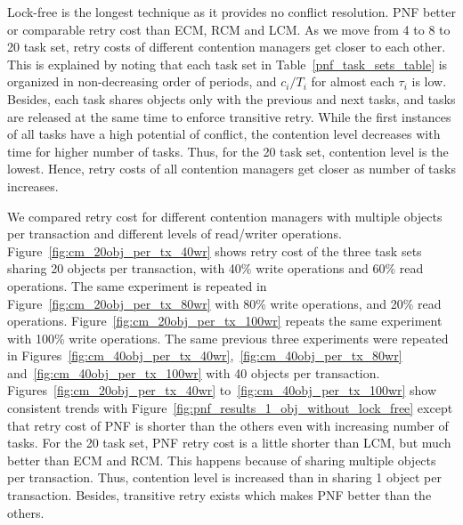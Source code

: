 \documentclass[a4paper,english]{article}
\begin{document}
Lock-free is the longest technique as it provides no conflict resolution. PNF better or comparable retry cost than ECM, RCM and LCM. As we move from 4 to 8 to 20 task set, retry costs of different contention managers get closer to each other. This is explained by noting that each task set in Table~\ref{pnf_task_sets_table} is organized in non-decreasing order of periods, and $c_i/T_i$ for almost each $\tau_i$ is low. Besides, each task shares objects only with the previous and next tasks, and tasks are released at the same time to enforce transitive retry. While the first instances of all tasks have a high potential of conflict, the contention level decreases with time for higher number of tasks. Thus, for the 20 task set, contention level is the lowest. Hence, retry costs of all contention managers get closer as number of tasks increases.

We compared retry cost for different contention managers with multiple objects per transaction and different levels of read/writer operations. Figure~\ref{fig:cm_20obj_per_tx_40wr} shows retry cost of the three task sets sharing 20 objects per transaction, with 40\% write operations and 60\% read operations. The same experiment is repeated in Figure~\ref{fig:cm_20obj_per_tx_80wr} with 80\% write operations, and 20\% read operations. Figure~\ref{fig:cm_20obj_per_tx_100wr} repeats the same experiment with 100\% write operations. The same previous three experiments were repeated in Figures~\ref{fig:cm_40obj_per_tx_40wr},~\ref{fig:cm_40obj_per_tx_80wr} and~\ref{fig:cm_40obj_per_tx_100wr} with 40 objects per transaction. Figures~\ref{fig:cm_20obj_per_tx_40wr} to~\ref{fig:cm_40obj_per_tx_100wr} show consistent trends with Figure~\ref{fig:pnf_results_1_obj_without_lock_free} except that retry cost of PNF is shorter than the others even with increasing number of tasks. For the 20 task set, PNF retry cost is a little shorter than LCM, but much better than ECM and RCM. This happens because of sharing multiple objects per transaction. Thus, contention level is increased than in sharing 1 object per transaction. Besides, transitive retry exists which makes PNF better than the others.
\end{document}
